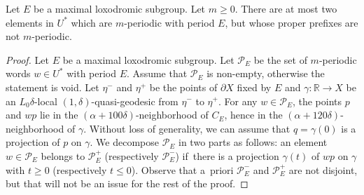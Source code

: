 \begin{prop}
\label{L: construction semi-group power sensitive}
Let $E$ be a maximal loxodromic subgroup.
Let $m \geq 0$.
There are at most two elements in $U^*$ which are $m$-periodic with period $E$, but whose proper prefixes are not $m$-periodic.
\end{prop}

\begin{proof} Let $E$ be a maximal loxodromic subgroup.
Let $\mathcal P_E$ be the set of $m$-periodic words $w \in U^*$ with period $E$.
Assume that $\mathcal P_E$ is non-empty, otherwise the statement is void.
Let $\eta^-$ and $\eta^+$ be the points of $\partial X$ fixed by $E$ and $\gamma \colon \mathbb R \to X$ be an $L_0\delta$-local $(1, \delta)$-quasi-geodesic from $\eta^-$ to $\eta^+$.
For any $w \in \mathcal P_E$, the points $p$ and $wp$ lie in the $(\alpha + 100\delta)$-neighborhood of $C_E$, hence in the $(\alpha + 120\delta)$-neighborhood of $\gamma$.
Without loss of generality, we can assume that $q = \gamma(0)$ is a projection of $p$ on $\gamma$.
We decompose $\mathcal P_E$ in two parts as follows: an element $w \in \mathcal P_E$ belongs to $\mathcal P_E^+$ (respectively $\mathcal P_E^-$) if~there is a projection $\gamma(t)$ of $wp$ on $\gamma$ with $t \geq 0$ (respectively $t \leq 0$).
Observe that a~priori $\mathcal P_E^-$ and $\mathcal P_E^+$ are not disjoint, but that will not be an issue for the rest of the proof.


\end{proof}
